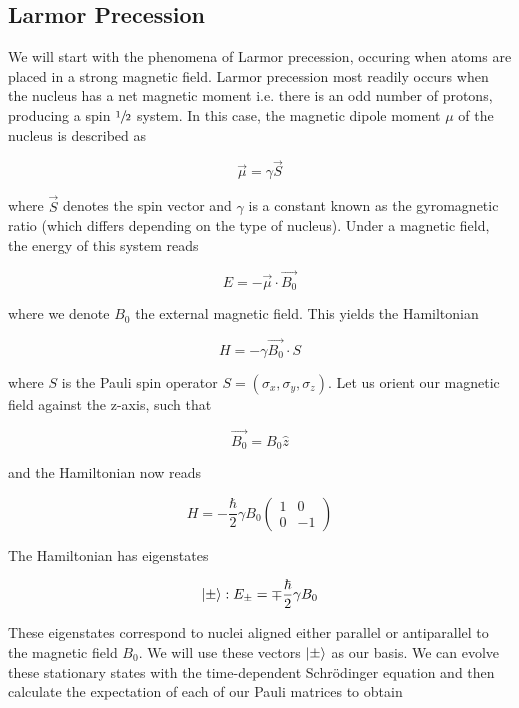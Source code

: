 \documentclass[%
 reprint,
 amsmath,amssymb,
 aps,
]{revtex4-2}
\DeclarePairedDelimiter\ket{\lvert}{\rangle}
\newcommand{\half}{$\sfrac{1}{2}$ }
\newcommand{\pauliz}{\begin{pmatrix}
                    1 & 0 \\
                    0 & -1 
                    \end{pmatrix}}
\begin{document}
\subsection{\label{subsec:larmor} Larmor Precession}

We will start with the phenomena of Larmor precession, occuring when atoms are placed in a strong magnetic field. Larmor precession most readily occurs when the nucleus has a net magnetic moment i.e. there is an odd number of protons, producing a spin \half  system. In this case, the magnetic dipole moment $\mu$ of the nucleus is described as 

\begin{equation}
    \vec{\mu} = \gamma \vec{S}
\end{equation}

where $\vec{S}$ denotes the spin vector and $\gamma$ is a constant known as the gyromagnetic ratio (which differs depending on the type of nucleus). Under a magnetic field, the energy of this system reads 

\begin{equation}
    E = -\vec{\mu} \cdot \vec{B_0}
\end{equation}

where we denote $B_0$ the external magnetic field. This yields the Hamiltonian 

\begin{equation}\label{eqn:base-hamiltonian}
    H = -\gamma \vec{B_0} \cdot S
\end{equation}

where $S$ is the Pauli spin operator $S = (\sigma_x, \sigma_y, \sigma_z)$. Let us orient our magnetic field against the z-axis, such that 

\begin{equation}
    \vec{B_0} = B_0 \hat{z} 
\end{equation}

and the Hamiltonian now reads

\begin{equation}\label{eqn:hamiltonian}
    H = -\frac{\hbar}{2} \gamma B_0  \pauliz
\end{equation}

The Hamiltonian has eigenstates

\begin{equation}
    \ket{\pm} : E_\pm = \mp \frac{\hbar}{2} \gamma B_0 
\end{equation}

These eigenstates correspond to nuclei aligned either parallel or antiparallel to the magnetic field $B_0$. We will use these vectors $\ket{\pm}$ as our basis. We can evolve these stationary states with the time-dependent Schr\"odinger equation and then calculate the expectation of each of our Pauli matrices to obtain 
\end{document}
